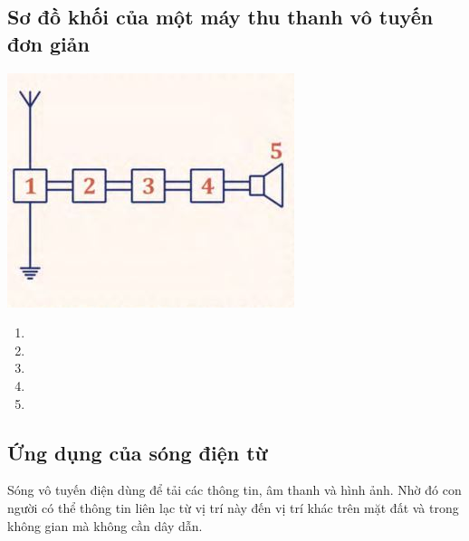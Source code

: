 \subsection {Sơ đồ khối của một máy thu thanh vô tuyến đơn giản}
\begin{center}
	\includegraphics[scale=0.7]{../figs/4-4-2.JPG}
\end{center}
\begin{enumerate}
	\item {}
	\item {}
	\item {}
	\item {}
	\item {}
\end{enumerate}
\subsection {Ứng dụng của sóng điện từ}
Sóng vô tuyến điện dùng để tải các thông tin, âm thanh và hình ảnh. Nhờ đó con người có thể thông tin liên lạc từ vị trí này đến vị trí khác trên mặt đất và trong không gian mà không cần dây dẫn.
